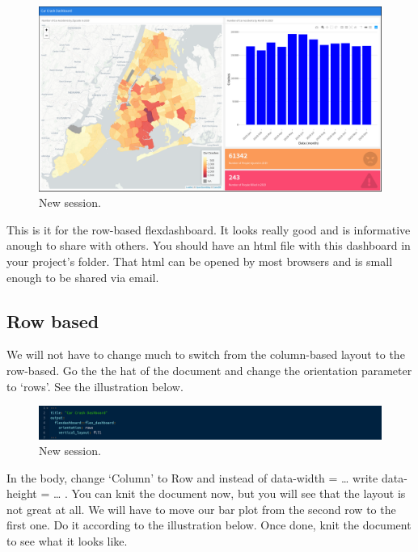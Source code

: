 \documentclass[]{book}
\begin{document}
\begin{figure}
\centering
\includegraphics{flex15.png}
\caption{New session.}
\end{figure}

This is it for the row-based flexdashboard. It looks really good and is informative anough to share with others. You should have an html file with this dashboard in your project's folder. That html can be opened by most browsers and is small enough to be shared via email.

\hypertarget{row-based}{%
\subsection{Row based}\label{row-based}}

We will not have to change much to switch from the column-based layout to the row-based. Go the the hat of the document and change the orientation parameter to `rows'. See the illustration below.

\begin{figure}
\centering
\includegraphics{flex16.png}
\caption{New session.}
\end{figure}

In the body, change `Column' to Row and instead of data-width = \ldots{} write data-height = \ldots{} . You can knit the document now, but you will see that the layout is not great at all. We will have to move our bar plot from the second row to the first one. Do it according to the illustration below. Once done, knit the document to see what it looks like.
\end{document}
